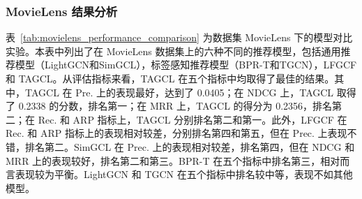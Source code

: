 \subsubsection{MovieLens 结果分析}
表~\ref{tab:movielens_performance_comparison} 为数据集 MovieLens 下的模型对比实验。本表中列出了在 MovieLens 数据集上的六种不同的推荐模型，包括通用推荐模型（LightGCN和SimGCL），标签感知推荐模型（BPR-T和TGCN），LFGCF 和 TAGCL。从评估指标来看，TAGCL 在五个指标中均取得了最佳的结果。其中，TAGCL 在 Pre. 上的表现最好，达到了 0.0405；在 NDCG 上，TAGCL 取得了 0.2338 的分数，排名第一；在 MRR 上，TAGCL 的得分为 0.2356，排名第二；在 Rec. 和 ARP 指标上，TAGCL 分别排名第二和第一。此外，LFGCF 在 Rec. 和 ARP 指标上的表现相对较差，分别排名第四和第五，但在 Prec. 上表现不错，排名第二。SimGCL 在 Prec. 上的表现相对较差，排名第四，但在 NDCG 和 MRR 上的表现较好，排名第二和第三。BPR-T 在五个指标中排名第三，相对而言表现较为平衡。LightGCN 和 TGCN 在五个指标中排名较中等，表现不如其他模型。
